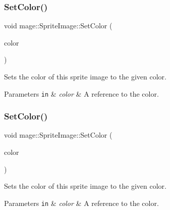 \subsubsection{\texorpdfstring{Set\+Color()}{SetColor()}\hspace{0.1cm}{\footnotesize\ttfamily [1/2]}}
{\footnotesize\ttfamily void mage\+::\+Sprite\+Image\+::\+Set\+Color (\begin{DoxyParamCaption}\item[{const \hyperlink{structmage_1_1_color}{Color} \&}]{color }\end{DoxyParamCaption})\hspace{0.3cm}{\ttfamily [noexcept]}}

Sets the color of this sprite image to the given color.


\begin{DoxyParams}[1]{Parameters}
\mbox{\tt in}  & {\em color} & A reference to the color. \\
\hline
\end{DoxyParams}
\hypertarget{classmage_1_1_sprite_image_a4ee2d13c618ef1c16e4cee8433f3d5dd}{}\label{classmage_1_1_sprite_image_a4ee2d13c618ef1c16e4cee8433f3d5dd} 
\subsubsection{\texorpdfstring{Set\+Color()}{SetColor()}\hspace{0.1cm}{\footnotesize\ttfamily [2/2]}}
{\footnotesize\ttfamily void mage\+::\+Sprite\+Image\+::\+Set\+Color (\begin{DoxyParamCaption}\item[{const X\+M\+V\+E\+C\+T\+OR \&}]{color }\end{DoxyParamCaption})\hspace{0.3cm}{\ttfamily [noexcept]}}

Sets the color of this sprite image to the given color.


\begin{DoxyParams}[1]{Parameters}
\mbox{\tt in}  & {\em color} & A reference to the color. \\
\hline
\end{DoxyParams}
\hypertarget{classmage_1_1_sprite_image_a12e0ffecc7995f13ccf0374fa37dc4c6}{}\label{classmage_1_1_sprite_image_a12e0ffecc7995f13ccf0374fa37dc4c6} 
